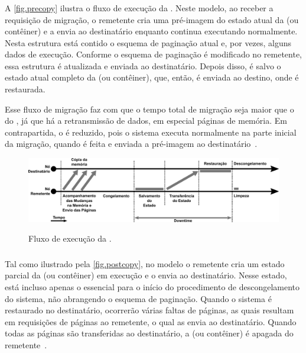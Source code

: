 \subsubsection{\Precopymigration}\label{sec.precopymigration}
A \autoref{fig.precopy} ilustra o fluxo de execução da \precopymigration. Neste modelo, ao receber a requisição de migração, o remetente cria uma pré-imagem do estado atual da \vm (ou contêiner) e a envia ao destinatário enquanto continua executando normalmente. Nesta estrutura está contido o esquema de paginação atual e, por vezes, alguns dados de execução. Conforme o esquema de paginação é modificado no remetente, essa estrutura é atualizada e enviada ao destinatário. Depois disso, é salvo o estado atual completo da \vm (ou contêiner), que, então, é enviada ao destino, onde é restaurada. 

Esse fluxo de migração faz com que o tempo total de migração seja maior que o do \coldmigration, já que há a retransmissão de dados, em especial páginas de memória. Em contrapartida, o \downtime é reduzido, pois o sistema executa normalmente na parte inicial da migração, quando é feita e enviada a pré-imagem ao destinatário~\cite{singh2022predictive, imran2022live}.

\begin{figure}[bt]
    \centering
    \caption{Fluxo de execução da \precopymigration.}
    \includegraphics[width=0.8\linewidth]{content/images/pre-copy-migration-flow.pdf}
    \label{fig.precopy}
\end{figure}

\subsubsection{\Postcopymigration}\label{sec.postcopymigration}
Tal como ilustrado pela \autoref{fig.postcopy}, no modelo \postcopymigration o remetente cria um estado parcial da \vm (ou contêiner) em execução e o envia ao destinatário. Nesse estado, está incluso apenas o essencial para o início do procedimento de descongelamento do sistema, não abrangendo o esquema de paginação. Quando o sistema é restaurado no destinatário, ocorrerão várias faltas de páginas, as quais resultam em requisições de páginas ao remetente, o qual as envia ao destinatário. Quando todas as páginas são transferidas ao destinatário, a \vm (ou contêiner) é apagada do remetente~\cite{singh2022predictive, imran2022live}.

